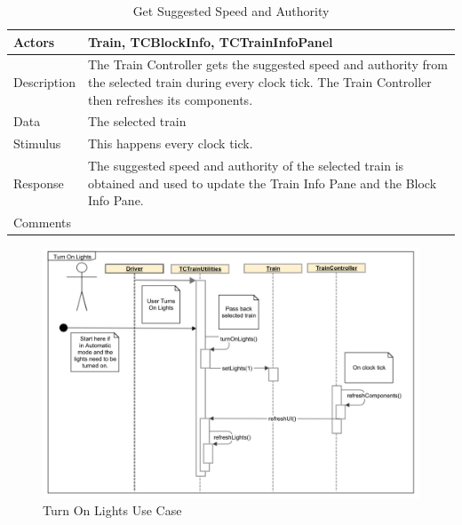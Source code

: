 \documentclass[]{article}
\begin{document}
\begin{table}[H]
	\centering
	\caption{Get Suggested Speed and Authority}
	\begin{tabular}{|l|l|}
		\hline
		Actors & \parbox[t]{10cm}{Train, TCBlockInfo, TCTrainInfoPanel} \\ \hline
		Description & \parbox[t]{10cm}{The Train Controller gets the suggested speed and authority from the selected train during every clock tick. The Train Controller then refreshes its components.} \\ \hline
		Data &  \parbox[t]{10cm}{The selected train} \\ \hline
		Stimulus &  \parbox[t]{10cm}{ This happens every clock tick. } \\ \hline
		Response & \parbox[t]{10cm}{The suggested speed and authority of the selected train is obtained and used to update the Train Info Pane and the Block Info Pane.  }\\ \hline
		Comments & \parbox[t]{10cm}{}  \\ \hline
	\end{tabular}
\end{table}

\begin{figure}[H]
	\centering
	\includegraphics[scale=.5]{tc_turnOnLights_usecase}
	\caption{Turn On Lights Use Case}
\end{figure}
\end{document}
